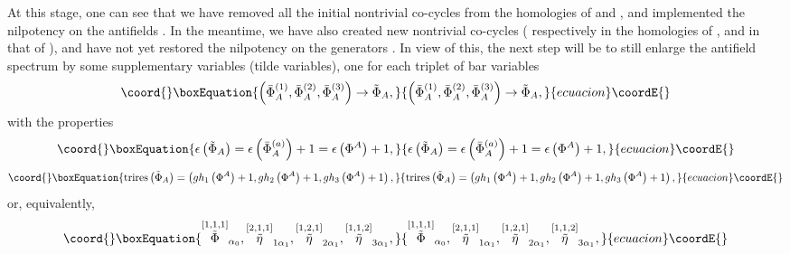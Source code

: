 \documentclass[a4paper,12pt]{article}
\begin{document}
At this stage, one can see that we have removed all the initial nontrivial
co-cycles from the homologies of \coordHE{} and \myHighlight{$\delta $}\coordHE{}, and
implemented the nilpotency on the antifields \coordHE{}.
In the meantime, we have also created new nontrivial co-cycles (\coordHE{} respectively in the homologies of \coordHE{}, and \coordHE{} in that of \myHighlight{$\delta $}\coordHE{}),
and have not yet restored the nilpotency on the generators \coordHE{}. In view of this, the next step will be to still enlarge the
antifield spectrum by some supplementary variables (tilde variables), one
for each triplet of bar variables 
\begin{equation}\coord{}\boxEquation{
\left( \bar{\Phi}_{A}^{(1)},\bar{\Phi}_{A}^{(2)},\bar{\Phi}_{A}^{(3)}\right)
\rightarrow \tilde{\Phi}_{A},  \label{sp3.50}
}{
\left( \bar{\Phi}_{A}^{(1)},\bar{\Phi}_{A}^{(2)},\bar{\Phi}_{A}^{(3)}\right)
\rightarrow \tilde{\Phi}_{A},  }{ecuacion}\coordE{}\end{equation}
with the properties 
\begin{equation}\coord{}\boxEquation{
\epsilon \left( \tilde{\Phi}_{A}\right) =\epsilon \left( \bar{\Phi}
_{A}^{(a)}\right) +1=\epsilon \left( \Phi ^{A}\right) +1,  \label{sp3.51}
}{
\epsilon \left( \tilde{\Phi}_{A}\right) =\epsilon \left( \bar{\Phi}
_{A}^{(a)}\right) +1=\epsilon \left( \Phi ^{A}\right) +1,  }{ecuacion}\coordE{}\end{equation}
\begin{equation}\coord{}\boxEquation{
\mathrm{trires}\left( \tilde{\Phi}_{A}\right) =\left( gh_{1}\left( \Phi
^{A}\right) +1,gh_{2}\left( \Phi ^{A}\right) +1,gh_{3}\left( \Phi
^{A}\right) +1\right) ,  \label{sp3.52}
}{
\mathrm{trires}\left( \tilde{\Phi}_{A}\right) =\left( gh_{1}\left( \Phi
^{A}\right) +1,gh_{2}\left( \Phi ^{A}\right) +1,gh_{3}\left( \Phi
^{A}\right) +1\right) ,  }{ecuacion}\coordE{}\end{equation}
or, equivalently, 
\begin{equation}\coord{}\boxEquation{
\stackrel{\left[ 1,1,1\right] }{\tilde{\Phi}}_{\alpha _{0}},\stackrel{\left[
2,1,1\right] }{\tilde{\eta}}_{1\alpha _{1}},\stackrel{\left[ 1,2,1\right] }{
\tilde{\eta}}_{2\alpha _{1}},\stackrel{\left[ 1,1,2\right] }{\tilde{\eta}}
_{3\alpha _{1}},  \label{sp3.53}
}{
\stackrel{\left[ 1,1,1\right] }{\tilde{\Phi}}_{\alpha _{0}},\stackrel{\left[
2,1,1\right] }{\tilde{\eta}}_{1\alpha _{1}},\stackrel{\left[ 1,2,1\right] }{
\tilde{\eta}}_{2\alpha _{1}},\stackrel{\left[ 1,1,2\right] }{\tilde{\eta}}
_{3\alpha _{1}},  }{ecuacion}\coordE{}\end{equation}
\end{document}
